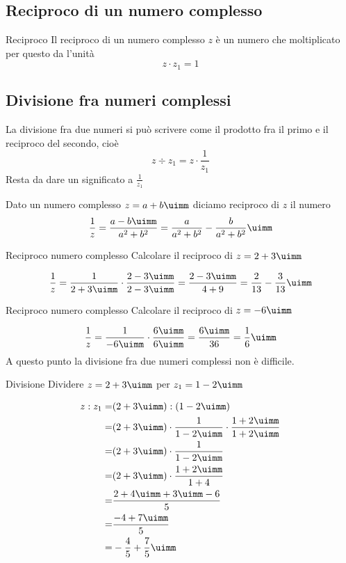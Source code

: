 \subsection{Reciproco di un numero complesso}
\begin{definizionet}{Reciproco}{}
Il reciproco di un numero complesso $z$ è un numero che moltiplicato per questo da l'unità
\[z\cdot z_1=1\]
\end{definizionet}
\subsection{Divisione fra numeri complessi}
La divisione fra due numeri si può scrivere come il prodotto fra il primo e il reciproco del secondo, cioè \[z\div z_1=z\cdot\dfrac{1}{z_1}\] Resta da dare un significato a $\frac{1}{z_1}$
\begin{definizionet}{}{}
	Dato un numero complesso $z=a+b\uimm $ diciamo reciproco di $z$ il numero \[\dfrac{1}{z}=\dfrac{a-b\uimm}{a^2+b^2}=\dfrac{a}{a^2+b^2}-\dfrac{b}{a^2+b^2}\uimm\]
\end{definizionet}
\begin{esempiot}{Reciproco numero complesso}{}
Calcolare il reciproco di $z=2+3\uimm$
\end{esempiot}
\[\dfrac{1}{z}=\dfrac{1}{2+3\uimm}\cdot\dfrac{2-3\uimm}{2-3\uimm}=\dfrac{2-3\uimm}{4+9}=\dfrac{2}{13}-\dfrac{3}{13}\uimm\]
\begin{esempiot}{Reciproco numero complesso}{}
	Calcolare il reciproco di $z=-6\uimm$
\end{esempiot}
	\[\dfrac{1}{z}=\dfrac{1}{-6\uimm}\cdot\dfrac{6\uimm}{6\uimm}=\dfrac{6\uimm}{36}=\dfrac{1}{6}\uimm\]
A questo punto la divisione fra due numeri complessi non è difficile.
\begin{esempiot}{Divisione}{}
Dividere $z=2+3\uimm$ per $z_1=1-2\uimm$
\end{esempiot}
\begin{align*}
z:z_1=&(2+3\uimm):(1-2\uimm)\\
=&(2+3\uimm)\cdot\dfrac{1}{1-2\uimm}\cdot\dfrac{1+2\uimm}{1+2\uimm}\\
=&(2+3\uimm)\cdot\dfrac{1}{1-2\uimm}\\
=&(2+3\uimm)\cdot\dfrac{1+2\uimm}{1+4}\\
=&\dfrac{2+4\uimm+3\uimm-6}{5}\\
=&\dfrac{-4+7\uimm}{5}\\
=&-\dfrac{4}{5}+\dfrac{7}{5}\uimm
\end{align*}
